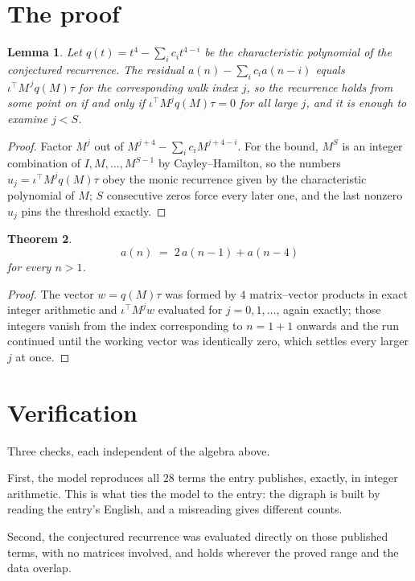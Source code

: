 \documentclass[11pt,a4paper]{article}
\theoremstyle{plain}
\newtheorem{theorem}{Theorem}
\newtheorem{lemma}[theorem]{Lemma}
\theoremstyle{definition}
\begin{document}
\section{The proof}

\begin{lemma}\label{lem:crit}
Let $q(t)=t^{4}-\sum_i c_it^{4-i}$ be the characteristic polynomial of the
conjectured recurrence. The residual $a(n)-\sum_ic_ia(n-i)$ equals
$\iota^{\!\top}M^{\,j}q(M)\tau$ for the corresponding walk index $j$, so the recurrence
holds from some point on if and only if $\iota^{\!\top}M^{j}q(M)\tau=0$ for all large $j$,
and it is enough to examine $j<S$.
\end{lemma}

\begin{proof}
Factor $M^{j}$ out of $M^{j+4}-\sum_ic_iM^{j+4-i}$. For the bound, $M^{S}$
is an integer combination of $I,M,\dots,M^{S-1}$ by Cayley--Hamilton, so the numbers
$u_j=\iota^{\!\top}M^{j}q(M)\tau$ obey the monic recurrence given by the characteristic
polynomial of $M$; $S$ consecutive zeros force every later one, and the last nonzero $u_j$
pins the threshold exactly.
\end{proof}

\begin{theorem}
\[
a(n)\;=\;2\,a(n-1) + a(n-4)
\]
for every $n>1$.
\end{theorem}

\begin{proof}
The vector $w=q(M)\tau$ was formed by $4$ matrix--vector products in exact integer
arithmetic and $\iota^{\!\top}M^{j}w$ evaluated for $j=0,1,\dots$, again exactly; those
integers vanish from the index corresponding to $n=1+1$ onwards and the run continued
until the working vector was identically zero, which settles every larger $j$ at once.
\end{proof}

\section{Verification}

Three checks, each independent of the algebra above.

First, the model reproduces all $28$ terms the entry publishes, exactly, in integer
arithmetic. This is what ties the model to the entry: the digraph is built by reading the
entry's English, and a misreading gives different counts.

Second, the conjectured recurrence was evaluated directly on those published terms, with no
matrices involved, and holds wherever the proved range and the data overlap.
\end{document}
